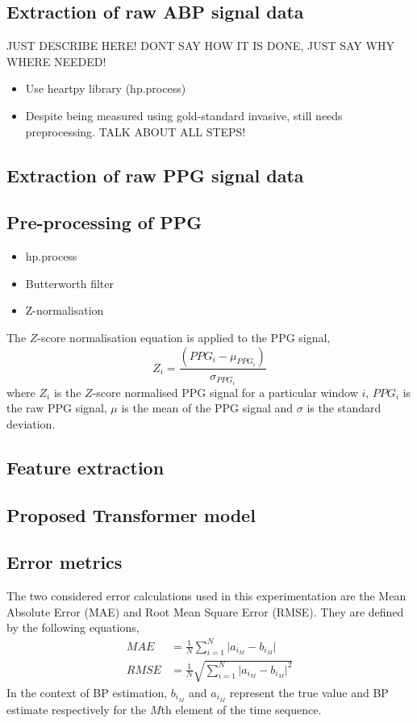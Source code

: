 \subsection{Extraction of raw ABP signal data}
JUST DESCRIBE HERE! DONT SAY HOW IT IS DONE, JUST SAY WHY WHERE NEEDED!
\begin{itemize}
    \item Use heartpy library (hp.process)
    \item Despite being measured using gold-standard invasive, still needs preprocessing. TALK ABOUT ALL STEPS!
\end{itemize}

\subsection{Extraction of raw PPG signal data}

\subsection{Pre-processing of PPG}
\begin{itemize}
    \item hp.process
    \item Butterworth filter
    \item Z-normalisation
\end{itemize}

The $Z$-score normalisation equation is applied to the PPG signal, 
\begin{equation}
    Z_{i} = \frac{(PPG_{i} - \mu_{PPG_i}) }{\sigma_{PPG_i}}
\end{equation} \noindent where $Z_{i}$ is the $Z$-score normalised PPG signal for a particular window $i$, 
$PPG_{i}$ is the raw PPG signal, $\mu$ is the mean of the PPG signal and $\sigma$ is the standard deviation.


\subsection{Feature extraction}

\subsection{Proposed Transformer model}

\subsection{Error metrics}
The two considered error calculations used in this experimentation are the Mean Absolute Error 
(MAE) and Root Mean Square Error (RMSE). They are defined by the following equations, 
\begin{align}
    MAE &= \frac{1}{N} \sum_{i=1}^N \lvert a_{i_{M}} - b_{i_{M}} \rvert \\
    RMSE &= \frac{1}{N} \sqrt{\sum_{i=1}^N \lvert a_{i_{M}} - b_{i_{M}} \rvert^2}
\end{align}\noindent In the context of BP estimation, $b_{i_{M}}$ and $a_{i_{M}}$ represent the true 
value and BP estimate respectively for the $M$th element of the time sequence.
